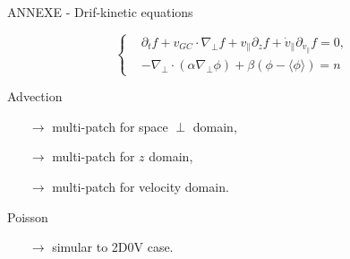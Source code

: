 \documentclass[
	english,%
	logo=false,%
	eurofusion=false, %
	titlegraphic=true, %
	]{ippbeamer}
\begin{document}
\begin{frame}{ANNEXE - Drif-kinetic equations}
\vspace*{0.5cm}
\scriptsize

\begin{equation}
\left\{
\begin{aligned}
	&\partial_t f 
		+ v_{GC}\cdot \nabla_{\perp}f 
		+ v_{\parallel} \partial_z f 
		+ \dot{v}_{\parallel} \partial_{v_{\parallel}} f
		= 0, \\
	&-\nabla_{\perp} \cdot (\alpha\nabla_{\perp} \phi) + \beta (\phi - \langle\phi\rangle) = n
\end{aligned}
\right.
\end{equation}

\vspace*{0.5cm}
Advection
\begin{itemize}
	\item[$\rightarrow$] multi-patch for space $\perp$ domain, 
	\item[$\rightarrow$] multi-patch for $z$ domain, 
	\item[$\rightarrow$] multi-patch for velocity domain.
\end{itemize}

\vspace*{0.25cm}
Poisson
\begin{itemize}
	\item[$\rightarrow$] simular to 2D0V case.
\end{itemize}
\end{frame}
\end{document}

